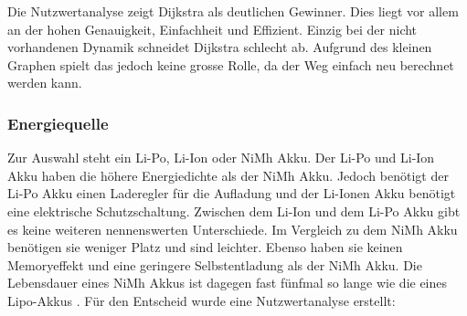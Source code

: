 \documentclass[../main.tex]{subfiles}
\begin{document}
Die Nutzwertanalyse zeigt Dijkstra als deutlichen Gewinner. Dies liegt vor allem an der hohen Genauigkeit, Einfachheit und Effizient. Einzig bei der nicht vorhandenen Dynamik schneidet Dijkstra schlecht ab. Aufgrund des kleinen Graphen spielt das jedoch keine grosse Rolle, da der Weg einfach neu berechnet werden kann.

\newpage

\subsubsection{Energiequelle}
\label{a3:Energiequelle}
Zur Auswahl steht ein Li-Po, Li-Ion oder NiMh Akku. Der Li-Po und Li-Ion Akku haben die höhere Energiedichte als der NiMh Akku. Jedoch benötigt der Li-Po Akku einen Laderegler für die Aufladung und der Li-Ionen Akku benötigt eine elektrische Schutzschaltung. Zwischen dem Li-Ion und dem Li-Po Akku gibt es keine weiteren nennenswerten Unterschiede. 
Im Vergleich zu dem NiMh Akku benötigen sie weniger Platz und sind leichter. Ebenso haben sie keinen Memoryeffekt und eine geringere Selbstentladung als der NiMh Akku. Die Lebensdauer eines NiMh Akkus ist dagegen fast fünfmal so lange wie die eines Lipo-Akkus\footnotemark
{}. Für den Entscheid wurde eine Nutzwertanalyse erstellt:
\end{document}
